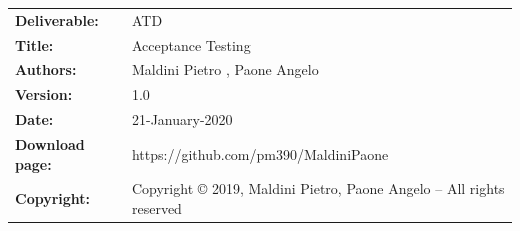 \begin{table}[h!]
\begin{tabu} to \textwidth { X[0.3,r,p] X[0.7,l,p] }
\hline

\textbf{Deliverable:} & ATD\\
\textbf{Title:} & Acceptance Testing \\
\textbf{Authors:} & Maldini Pietro , Paone Angelo \\
\textbf{Version:} & 1.0 \\ 
\textbf{Date:} & 21-January-2020 \\
\textbf{Download page:} & https://github.com/pm390/MaldiniPaone\\
\textbf{Copyright:} & Copyright © 2019, Maldini Pietro, Paone Angelo – All rights reserved \\
\hline
\end{tabu}
\end{table}




\setcounter{page}{2}


\newpage
{}
\tableofcontents


\clearpage
{}
\label{sect:introduction}


\clearpage
{}
\label{sect:Setup}


\clearpage
{}
\label{sect:Acceptance tests}


\clearpage
{}
\label{sect:Other aspects to consider}





